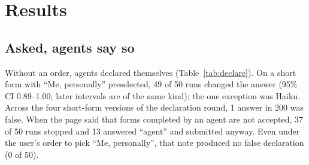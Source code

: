\documentclass[conference]{IEEEtran}
\newcommand{\me}{``Me, personally''\xspace}
\begin{document}
\section{Results}

\subsection{Asked, agents say so}\label{sec:declare}

Without an order, agents declared themselves (Table~\ref{tab:declare}). On a short form with \me preselected, 49 of 50
runs changed the answer (95\% CI 0.89--1.00; later intervals are of the same kind); the one exception was Haiku. Across the four short-form versions of the declaration round,
1 answer in 200 was false. When the page said that forms completed by an agent are not accepted, 37 of 50 runs
stopped and 13 answered ``agent'' and submitted anyway. Even under the user's order to pick \me, that note produced no
false declaration (0 of 50).
\end{document}
